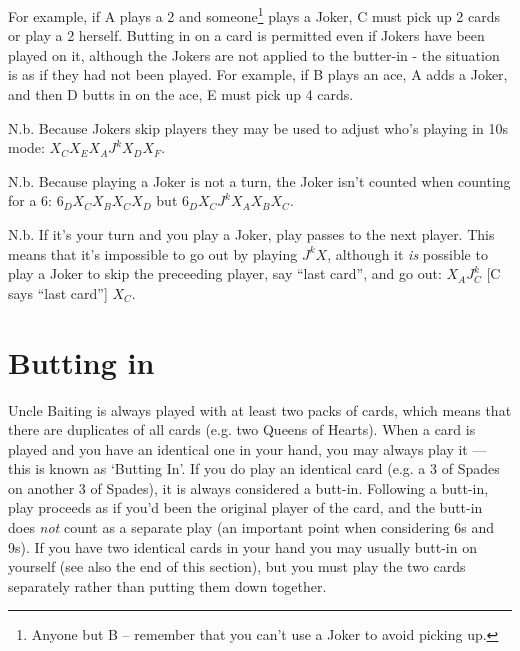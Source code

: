 \documentclass[12pt]{article}
\begin{document}
\begin{description}
    For example, if A plays a 2 and someone\footnote{Anyone but B -- remember that you can't use a
      Joker to avoid picking up.} plays a Joker, C must pick up 2 cards or play a 2 herself.  Butting in on a
    card is permitted even if Jokers have been played on it, although the Jokers are not applied to the butter-in - the situation is as if they had not been played.  For
    example, if B plays an ace, A adds a Joker, and then D butts in on the ace, E must pick up 4 cards.

    N.b. Because Jokers skip players they may be used to adjust who's playing in 10s mode:
    $X_C X_E X_A J^k X_D X_F$.

    N.b. Because playing a Joker is not a turn, the Joker isn't counted when counting for a 6:
    $6_D X_C X_B X_C X_D$ but $6_D X_C J^k X_A X_B X_C$.

    N.b. If it's your turn and you play a Joker, play passes to the next player.  This means that it's
    impossible to go out by playing $J^k X$, although it \textit{is} possible to play a Joker to skip the
    preceeding player, say ``last card'', and go out: $X_A J^k_C$ [C says ``last card''] $X_C$.
\end{description}

\section{Butting in}
\label{buttingIn}

Uncle Baiting is always played with at least two packs of cards, which means that there are duplicates of all
cards (e.g. two Queens of Hearts).  When a card is played and you have an identical one in your hand, you may
always play it --- this is known as `Butting In'. If you do play an identical card (e.g. a 3 of Spades on another 3 of Spades), it is always considered a butt-in.  Following a butt-in, play proceeds as if you'd been the
original player of the card, and the butt-in does \emph{not} count as a separate play (an important point when
considering 6s and 9s).  If you have two identical cards in your hand you may usually butt-in on yourself (see also the end of this section), but you
must play the two cards separately rather than putting them down together.
\end{document}
